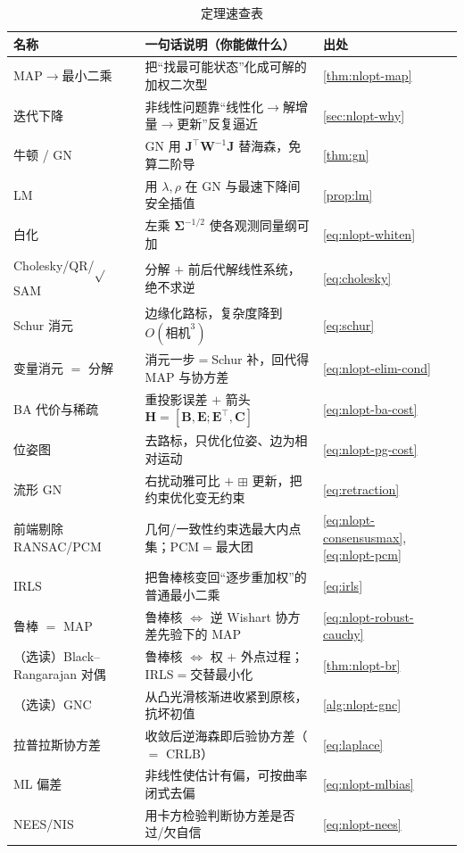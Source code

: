 \begin{table}[H]\centering\small
\caption{定理速查表}
\begin{tabular}{lll}
\toprule
名称 & 一句话说明（你能做什么） & 出处 \\
\midrule
MAP$\to$最小二乘 & 把“找最可能状态”化成可解的加权二次型 & \cref{thm:nlopt-map} \\
迭代下降 & 非线性问题靠“线性化$\to$解增量$\to$更新”反复逼近 & \cref{sec:nlopt-why} \\
牛顿 / GN & GN 用 $\mathbf{J}^\top\mathbf{W}^{-1}\mathbf{J}$ 替海森，免算二阶导 & \cref{thm:gn} \\
LM & 用 $\lambda,\rho$ 在 GN 与最速下降间安全插值 & \cref{prop:lm} \\
白化 & 左乘 $\boldsymbol{\Sigma}^{-1/2}$ 使各观测同量纲可加 & \cref{eq:nlopt-whiten} \\
Cholesky/QR/$\sqrt{}$SAM & 分解 $+$ 前后代解线性系统，绝不求逆 & \cref{eq:cholesky} \\
Schur 消元 & 边缘化路标，复杂度降到 $O(\text{相机}^3)$ & \cref{eq:schur} \\
变量消元 $=$ 分解 & 消元一步$=$Schur 补，回代得 MAP 与协方差 & \cref{eq:nlopt-elim-cond} \\
BA 代价与稀疏 & 重投影误差 $+$ 箭头 $\mathbf{H}=[\mathbf{B},\mathbf{E};\mathbf{E}^\top,\mathbf{C}]$ & \cref{eq:nlopt-ba-cost} \\
位姿图 & 去路标，只优化位姿、边为相对运动 & \cref{eq:nlopt-pg-cost} \\
流形 GN & 右扰动雅可比 $+$ $\boxplus$ 更新，把约束优化变无约束 & \cref{eq:retraction} \\
前端剔除 RANSAC/PCM & 几何/一致性约束选最大内点集；PCM$=$最大团 & \cref{eq:nlopt-consensusmax},\cref{eq:nlopt-pcm} \\
IRLS & 把鲁棒核变回“逐步重加权”的普通最小二乘 & \cref{eq:irls} \\
鲁棒 $=$ MAP & 鲁棒核 $\Leftrightarrow$ 逆 Wishart 协方差先验下的 MAP & \cref{eq:nlopt-robust-cauchy} \\
（选读）Black--Rangarajan 对偶 & 鲁棒核 $\Leftrightarrow$ 权 $+$ 外点过程；IRLS$=$交替最小化 & \cref{thm:nlopt-br} \\
（选读）GNC & 从凸光滑核渐进收紧到原核，抗坏初值 & \cref{alg:nlopt-gnc} \\
拉普拉斯协方差 & 收敛后逆海森即后验协方差（$=$ CRLB） & \cref{eq:laplace} \\
ML 偏差 & 非线性使估计有偏，可按曲率闭式去偏 & \cref{eq:nlopt-mlbias} \\
NEES/NIS & 用卡方检验判断协方差是否过/欠自信 & \cref{eq:nlopt-nees} \\

\end{tabular}
\end{table}
